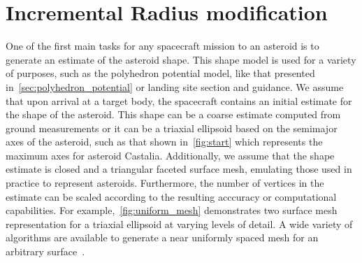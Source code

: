 \section{Incremental Radius modification}





One of the first main tasks for any spacecraft mission to an asteroid is to generate an estimate of the asteroid shape.
This shape model is used for a variety of purposes, such as the polyhedron potential model, like that presented in~\cref{sec:polyhedron_potential} or landing site section and guidance.
We assume that upon arrival at a target body, the spacecraft contains an initial estimate for the shape of the asteroid.
This shape can be a coarse estimate computed from ground measurements or it can be a triaxial ellipsoid based on the semimajor axes of the asteroid, such as that shown in~\cref{fig:start} which represents the maximum axes for asteroid Castalia.
Additionally, we assume that the shape estimate is closed and a triangular faceted surface mesh, emulating those used in practice to represent asteroids.
Furthermore, the number of vertices in the estimate can be scaled according to the resulting acccuracy or computational capabilities.
For example,~\cref{fig:uniform_mesh} demonstrates two surface mesh representation for a triaxial ellipsoid at varying levels of detail. 
A wide variety of algorithms are available to generate a near uniformly spaced mesh for an arbitrary surface~\cite{persson2004,boissonnat2005}.
